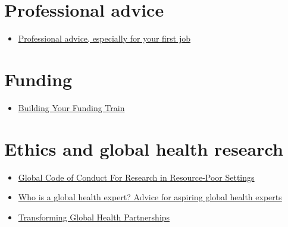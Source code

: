 \documentclass[
]{book}
\providecommand{\tightlist}{%
  \setlength{\itemsep}{0pt}\setlength{\parskip}{0pt}}
\begin{document}
\section{Professional advice}\label{professional-advice}

\begin{itemize}
\tightlist
\item
  \href{https://docs.google.com/document/d/1ckgRCcr7FFPyymyMA6Y_-cB_vftOyrrxT28c6gRg0PI/edit}{Professional advice, especially for your first job}
\end{itemize}

\section{Funding}\label{funding}

\begin{itemize}
\tightlist
\item
  \href{https://grantwriting.stanford.edu/funding-train/\#ep}{Building Your Funding Train}
\end{itemize}

\section{Ethics and global health research}\label{ethics-and-global-health-research}

\begin{itemize}
\tightlist
\item
  \href{https://www.globalcodeofconduct.org/wp-content/uploads/2018/05/Global-Code-of-Conduct-Brochure.pdf}{Global Code of Conduct For Research in Resource-Poor Settings}
\item
  \href{https://journals.plos.org/globalpublichealth/article?id=10.1371/journal.pgph.0002269}{Who is a global health expert? Advice for aspiring global health experts}
\item
  \href{https://link.springer.com/book/9783031537929}{Transforming Global Health Partnerships}
\end{itemize}

  
\end{document}
